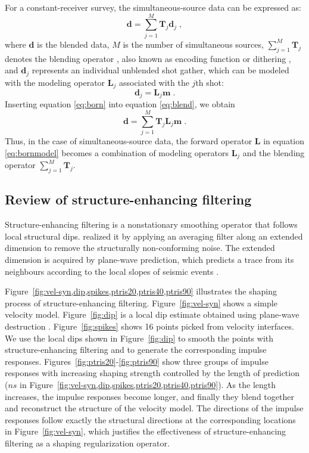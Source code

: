 For a constant-receiver survey, the simultaneous-source data can be expressed as:
\begin{equation}
\label{eq:blend}
\mathbf{d} = \sum_{j=1}^{M} \mathbf{T}_j\mathbf{d}_j \; ,
\end{equation}
where $\mathbf{d}$ is the blended data, $M$ is the number of simultaneous sources, 
$\sum_{j=1}^{M} \mathbf{T}_j$ denotes the blending operator \cite[]{berkhout}, 
also known as encoding function \cite[]{romero00} or dithering \cite[]{chen14}, 
and $\mathbf{d}_j$ represents an individual unblended shot gather, 
which can be modeled with the modeling operator $\mathbf{L}_j$ associated with the $j$th shot:
\begin{equation}
\label{eq:born}
\mathbf{d}_j = \mathbf{L}_j \mathbf{m} \; .
\end{equation}
Inserting equation \ref{eq:born} into equation \ref{eq:blend}, we obtain
\begin{equation}
\label{eq:blendfinal}
\mathbf{d} = \sum_{j=1}^{M} \mathbf{T}_j\mathbf{L}_j \mathbf{m} \; .
\end{equation}
Thus, in the case of simultaneous-source data, the forward operator $\mathbf{L}$ in equation \ref{eq:bornmodel} 
becomes a combination of modeling operators $\mathbf{L}_j$ and the blending operator $\sum_{j=1}^{M} \mathbf{T}_j$.

\subsection{Review of structure-enhancing filtering}
Structure-enhancing filtering is a nonstationary smoothing operator that follows local structural dips. 
\cite{liuyang} realized it by applying an averaging filter along an extended dimension to remove the structurally non-conforming noise. 
The extended dimension is acquired by plane-wave prediction, which predicts a trace from its neighbours according to 
the local slopes of seismic events \cite[]{sergeypaint}.

Figure~\ref{fig:vel-syn,dip,spikes,ptris20,ptris40,ptris90} illustrates the shaping process of structure-enhancing filtering. 
Figure~\ref{fig:vel-syn} shows a simple velocity model.
Figure~\ref{fig:dip} is a local dip estimate obtained using plane-wave destruction \cite[]{fomel2002pwd}.
Figure~\ref{fig:spikes} shows 16 points picked from velocity interfaces. 
We use the local dips shown in Figure~\ref{fig:dip} to smooth the points with structure-enhancing filtering and 
to generate the corresponding impulse responses.
Figures~\ref{fig:ptris20}-\ref{fig:ptris90} show three groups of impulse responses with increasing shaping strength 
controlled by the length of prediction ($ns$ in Figure~\ref{fig:vel-syn,dip,spikes,ptris20,ptris40,ptris90}).
As the length increases, the impulse responses become longer, and finally they blend together and reconstruct the structure of the velocity model.
The directions of the impulse responses follow exactly the structural directions at the corresponding locations in Figure~\ref{fig:vel-syn},
which justifies the effectiveness of structure-enhancing filtering as a shaping regularization operator.

